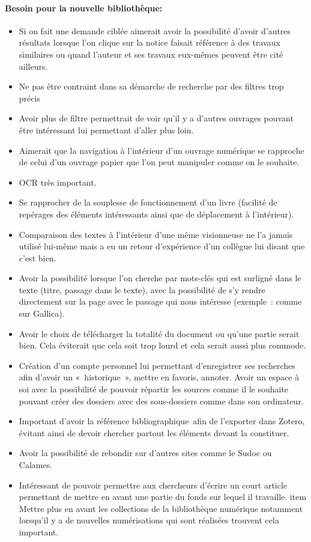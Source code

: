 \paragraph*{Besoin pour la nouvelle bibliothèque:}

\begin{itemize}
	\item Si on fait une demande ciblée aimerait avoir la possibilité d’avoir d’autres résultats lorsque l’on clique sur la notice faisait référence à des travaux similaires ou quand l’auteur et ses travaux eux-mêmes peuvent être cité ailleurs.
	\item Ne pas être contraint dans sa démarche de recherche par des filtres trop précis
	\item Avoir plus de filtre permettrait de voir qu’il y a d’autres ouvrages pouvant être intéressant lui permettant d’aller plus loin.
	\item Aimerait que la navigation à l’intérieur d’un ouvrage numérique se rapproche de celui d’un ouvrage papier que l’on peut manipuler comme on le souhaite.
	\item OCR très important.
	\item Se rapprocher de la souplesse de fonctionnement d’un livre (facilité de repérages des éléments intéressants ainsi que de déplacement à l’intérieur). 
	\item Comparaison des textes à l’intérieur d’une même visionneuse ne l’a jamais utilisé lui-même mais a eu un retour d’expérience d’un collègue lui disant que c’est bien.
	\item Avoir la possibilité lorsque l’on cherche par mots-clés qui est surligné dans le texte (titre, passage dans le texte), avec la possibilité de s’y rendre directement sur la page avec le passage qui nous intéresse (exemple : comme sur Gallica).
	\item Avoir le choix de télécharger la totalité du document ou qu’une partie serait bien. Cela éviterait que cela soit trop lourd et cela serait aussi plus commode.
	\item Création d’un compte personnel lui permettant d’enregistrer ses recherches afin d’avoir un « historique », mettre en favoris, annoter. Avoir un espace à soi avec la possibilité de pouvoir répartir les sources comme il le souhaite pouvant créer des dossiers avec des sous-dossiers comme dans son ordinateur.
	\item Important d’avoir la référence bibliographique afin de l’exporter dans Zotero, évitant ainsi de devoir chercher partout les éléments devant la constituer.
	\item Avoir la possibilité de rebondir sur d’autres sites comme le Sudoc ou Calames.
	\item Intéressant de pouvoir permettre aux chercheurs d’écrire un court article permettant de mettre en avant une partie du fonds sur lequel il travaille.
	item Mettre plus en avant les collections de la bibliothèque numérique notamment lorsqu’il y a de nouvelles numérisations qui sont réalisées trouvent cela important.
	
\end{itemize}

